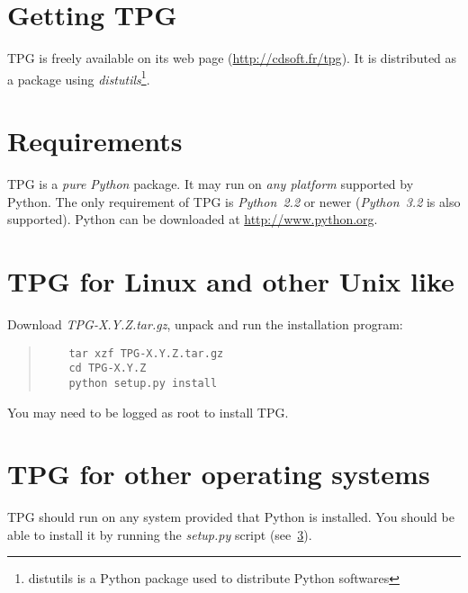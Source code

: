 
\section{Getting TPG}

TPG is freely available on its web page (\url{http://cdsoft.fr/tpg}). It is distributed as a package using \emph{distutils}\footnote{distutils is a Python package used to distribute Python softwares}.

\section{Requirements}

TPG is a \emph{pure Python} package.
It may run on \emph{any platform} supported by Python.
The only requirement of TPG is \emph{Python~2.2} or newer (\emph{Python~3.2} is also supported). Python can be downloaded at \url{http://www.python.org}.

\section{TPG for Linux and other Unix like}                 \label{linux_install}

Download \mbox{\emph{TPG-X.Y.Z.tar.gz}}, unpack and run the installation program:
\begin{quote}
\begin{verbatim}
    tar xzf TPG-X.Y.Z.tar.gz
    cd TPG-X.Y.Z
    python setup.py install
\end{verbatim}
\end{quote}
You may need to be logged as root to install TPG.

\section{TPG for other operating systems}

TPG should run on any system provided that Python is installed. You should be able to install it by running the \mbox{\emph{setup.py}} script (see~\ref{linux_install}).
